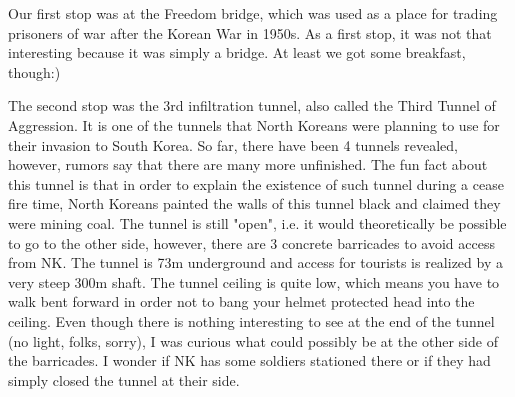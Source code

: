 \begin{post}
\begin{content}
\begin{figure}
\centering{}
\vspace{-26pt}
\end{figure}Our first stop was at the Freedom bridge, which was used as a place for trading prisoners of war after the Korean War in 1950s. As a first stop, it was not that interesting because it was simply a bridge. At least we got some breakfast, though:)

The second stop was the 3rd infiltration tunnel, also called the Third Tunnel of Aggression. It is one of the tunnels that North Koreans were planning to use for their invasion to South Korea. So far, there have been 4 tunnels revealed, however, rumors say that there are many more unfinished. The fun fact about this tunnel is that in order to explain the existence of such tunnel during a cease fire time, North Koreans painted the walls of this tunnel black and claimed they were mining coal. The tunnel is still "open", i.e. it would theoretically be possible to go to the other side, however, there are 3 concrete barricades to avoid access from NK. The tunnel is 73m underground and access for tourists is realized by a very steep 300m shaft. The tunnel ceiling is quite low, which means you have to walk bent forward in order not to bang your helmet protected head into the ceiling. Even though there is nothing interesting to see at the end of the tunnel (no light, folks, sorry), I was curious what could possibly be at the other side of the barricades. I wonder if NK has some soldiers stationed there or if they had simply closed the tunnel at their side.



\end{content}
\end{post}
